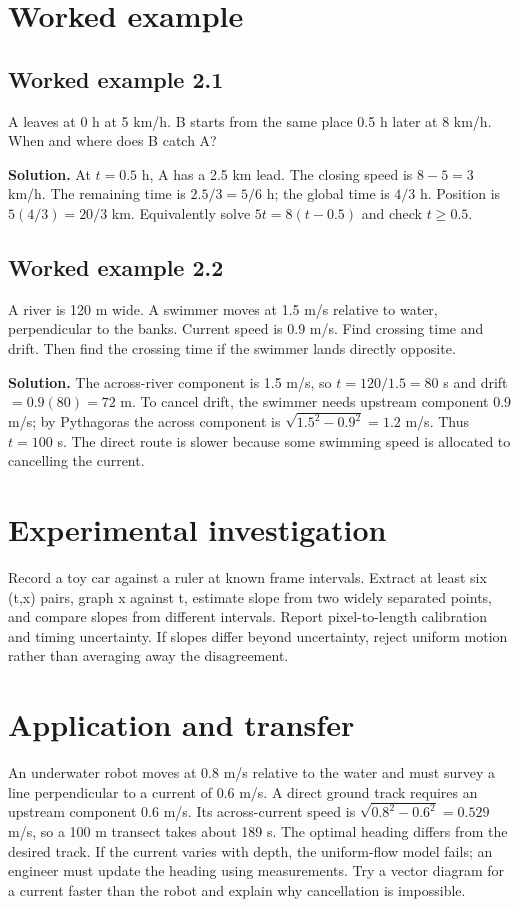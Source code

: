\documentclass[11pt,a4paper,openany]{book}
\begin{document}
\section{Worked example}
\subsection*{Worked example 2.1}
A leaves at 0 h at 5 km/h. B starts from the same place 0.5 h later at 8 km/h. When and where does B catch A?

\textbf{Solution.} At $t=0.5$ h, A has a 2.5 km lead. The closing speed is $8-5=3$ km/h. The remaining time is $2.5/3=5/6$ h; the global time is $4/3$ h. Position is $5(4/3)=20/3$ km. Equivalently solve $5t=8(t-0.5)$ and check $t\ge0.5$.
\subsection*{Worked example 2.2}
A river is 120 m wide. A swimmer moves at 1.5 m/s relative to water, perpendicular to the banks. Current speed is 0.9 m/s. Find crossing time and drift. Then find the crossing time if the swimmer lands directly opposite.

\textbf{Solution.} The across-river component is 1.5 m/s, so $t=120/1.5=80$ s and drift $=0.9(80)=72$ m. To cancel drift, the swimmer needs upstream component 0.9 m/s; by Pythagoras the across component is $\sqrt{1.5^2-0.9^2}=1.2$ m/s. Thus $t=100$ s. The direct route is slower because some swimming speed is allocated to cancelling the current.
\section{Experimental investigation}
Record a toy car against a ruler at known frame intervals. Extract at least six (t,x) pairs, graph x against t, estimate slope from two widely separated points, and compare slopes from different intervals. Report pixel-to-length calibration and timing uncertainty. If slopes differ beyond uncertainty, reject uniform motion rather than averaging away the disagreement.
\section{Application and transfer}
An underwater robot moves at 0.8 m/s relative to the water and must survey a line perpendicular to a current of 0.6 m/s. A direct ground track requires an upstream component 0.6 m/s. Its across-current speed is $\sqrt{0.8^2-0.6^2}=0.529$ m/s, so a 100 m transect takes about 189 s. The optimal heading differs from the desired track. If the current varies with depth, the uniform-flow model fails; an engineer must update the heading using measurements. Try a vector diagram for a current faster than the robot and explain why cancellation is impossible.
\end{document}
